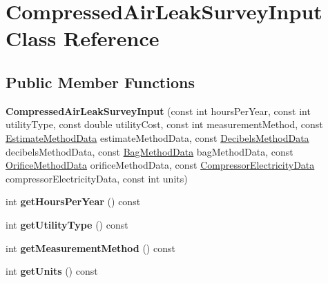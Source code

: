\hypertarget{class_compressed_air_leak_survey_input}{}\section{Compressed\+Air\+Leak\+Survey\+Input Class Reference}
\label{class_compressed_air_leak_survey_input}
\subsection*{Public Member Functions}
\begin{DoxyCompactItemize}
\item 
\mbox{\label{class_compressed_air_leak_survey_input_ad39d455788d74edeb8b285e1e6a72408}} 
{\bfseries Compressed\+Air\+Leak\+Survey\+Input} (const int hours\+Per\+Year, const int utility\+Type, const double utility\+Cost, const int measurement\+Method, const \hyperlink{class_estimate_method_data}{Estimate\+Method\+Data} estimate\+Method\+Data, const \hyperlink{class_decibels_method_data}{Decibels\+Method\+Data} decibels\+Method\+Data, const \hyperlink{class_bag_method_data}{Bag\+Method\+Data} bag\+Method\+Data, const \hyperlink{class_orifice_method_data}{Orifice\+Method\+Data} orifice\+Method\+Data, const \hyperlink{class_compressor_electricity_data}{Compressor\+Electricity\+Data} compressor\+Electricity\+Data, const int units)
\item 
\mbox{\label{class_compressed_air_leak_survey_input_ad8bbb597ffa0ff210c11e47c493c6c6c}} 
int {\bfseries get\+Hours\+Per\+Year} () const
\item 
\mbox{\label{class_compressed_air_leak_survey_input_af4cabd84565e5481c81edbd5116e044c}} 
int {\bfseries get\+Utility\+Type} () const
\item 
\mbox{\label{class_compressed_air_leak_survey_input_a77d57d1517f35d5397e8d6160a9cbe4a}} 
int {\bfseries get\+Measurement\+Method} () const
\item 
\mbox{\label{class_compressed_air_leak_survey_input_a72e81855b93c1bdc1e96de8c77cff98a}} 
int {\bfseries get\+Units} () const

\end{DoxyCompactItemize}
